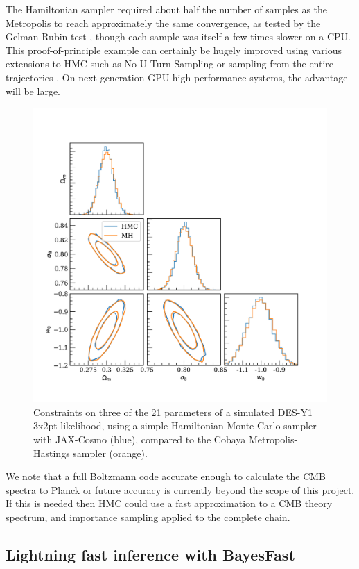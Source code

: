 \documentclass[final,5p,times,twocolumn,authoryear]{elsarticle}
\begin{document}
The Hamiltonian sampler required about half the number of samples as the Metropolis to reach approximately the same
convergence, as tested by the Gelman-Rubin test \citep{gelman}, though each sample was itself a few times slower
on a CPU.  This proof-of-principle example can certainly be hugely improved using various extensions to HMC such as No U-Turn Sampling \citep{nuts} or sampling from the entire trajectories \cite{betancourt}.  On next generation GPU high-performance systems, the advantage will be large.

\begin{figure}
\includegraphics[width=0.95\columnwidth]{figures/hmc.pdf}
\caption{Constraints on three of the 21 parameters of a simulated DES-Y1 3x2pt likelihood, using a simple Hamiltonian
Monte Carlo sampler with JAX-Cosmo (blue), compared to the Cobaya Metropolis-Hastings sampler (orange).}
\end{figure}


We note that a full Boltzmann code accurate enough to calculate the CMB spectra to Planck \citep{planck18}
or future \citep{s4,simons} accuracy is currently beyond the scope of this project.  
If this is needed then HMC could use a fast approximation to a CMB theory spectrum, and importance sampling applied to the complete chain.


\subsection{Lightning fast inference with BayesFast}
\end{document}
